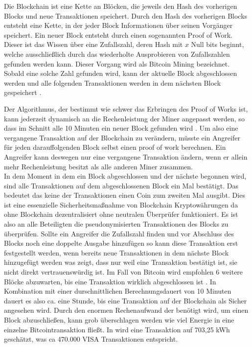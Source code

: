 \documentclass[11pt,a4paper]{scrreprt}
\begin{document}
Die Blockchain ist eine Kette an Blöcken, die jeweils den Hash des vorherigen Blocks und neue Transaktionen speichert. Durch den Hash des vorherigen Blocks entsteht eine Kette, in der jeder Block Informationen über seinen Vorgänger speichert. Ein neuer Block entsteht durch einen sogenannten Proof of Work. Dieser ist das Wissen über eine Zufallszahl, deren Hash mit $x$ Null bits beginnt, welche ausschließlich durch das wiederholte Ausprobieren von Zufallszahlen gefunden werden kann. Dieser Vorgang wird als Bitcoin Mining bezeichnet. Sobald eine solche Zahl gefunden wird, kann der aktuelle Block abgeschlossen werden und alle folgenden Transaktionen werden in dem nächsten Block gespeichert \cite{btc-nakamoto2008bitcoin}.

Der Algorithmus, der bestimmt wie schwer das Erbringen des Proof of Works ist, kann jederzeit dynamisch an die Rechenleistung der Miner angepasst werden, so dass im Schnitt alle 10 Minuten ein neuer Block gefunden wird \cite{btc-beginnerGuide}. Um also eine vergangene Transaktion auf der Blockchain zu verändern, müsste ein Angreifer für jeden darauffolgenden Block selbst einen proof of work berechnen. Ein Angreifer kann deswegen nur eine vergangene Transaktion ändern, wenn er allein mehr Rechenleistung besitzt als alle anderen Miner zusammen. \\

In dem Moment in dem ein Block abgeschlossen und der nächste begonnen wird, sind alle Transaktionen auf dem abgeschlossenen Block ein Mal bestätigt. Das bedeutet das keine der Transaktionen einen Coin zum zweiten Mal ausgibt. Dies ist eine essenzielle Sicherheitsmaßnahme von Blockchain Kryptowährungen da ohne Blockchain dezentralisiert ohne neutralen Überprüfer funktioniert. Es ist also an alle Beteiligten die pseudonymisierten Transaktionen des Blocks zu überprüfen. Sollte ein Angreifer die Zufallszahl finden und vor Abschluss des Blocks noch eine doppelte Ausgabe hinzufügen so kann diese Transaktion erst festgestellt werden, wenn bereits neue Transaktionen in dem nächste Block hinzugefügt werden was zeigt, dass nur weil eine Transaktion bestätigt ist, sie nicht direkt vertrauenswürdig ist. Im Fall von Bitcoin wird empfohlen 6 weitere Blöcke abzuwarten, bis eine Transaktion wirklich abgeschlossen ist \cite{btc-blocksToConfirm}. In Kombination mit einer durschnittlichen Berechnungsdauert von 10 Minuten dauert es also ca. eine Stunde, bis eine Transaktion auf der Blockchain als Sicher angesehen wird.
Durch den enormen Rechenaufwand der benötigt wird, um einen Block abzuschließen, kann grob überschlagen werden wie viel Energie in eine einzelne Bitcointransaktion fließt. In \cite{btc-energyConsumption} wird eine Transaktion auf 703,25 kWh geschätzt, was ca 470.000 VISA Transaktionen entspricht.\\
\end{document}
